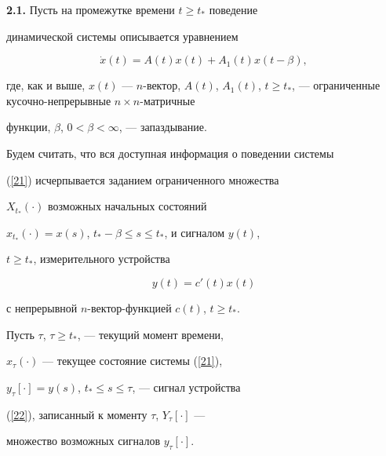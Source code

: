\medskip





{\bf 2.1.} Пусть на промежутке времени $t \ge t_{*}$ поведение


динамической системы описывается уравнением


\begin{equation}\label{21}


\Dot x (t)=A(t)x(t)+A_1(t)x(t-\beta),


\end{equation}


где, как и выше, $x(t)$ --- $n$-вектор, $A(t)$, $A_1(t)$, $t \ge


t_*$, --- ограниченные кусочно-непрерывные $n \times n$-матричные


функции, $\beta$, $0 < \beta < \infty$, --- запаздывание.





Будем считать, что вся доступная информация о поведении системы


(\ref{21}) исчерпывается заданием ограниченного множества


$X_{t_*}(\cdot)$ возможных начальных состояний


$x_{t_*}(\cdot)=x(s)$, $t_*-\beta \le s \le t_*$, и сигналом $y(t)$,


$t \ge t_*$, измерительного устройства


\begin{equation}\label{22}


y(t)=c'(t)x(t)


\end{equation}


с непрерывной $n$-вектор-функцией $c(t)$, $t \ge t_*$.





Пусть $\tau$, $\tau \ge t_*$, --- текущий момент времени, 


$x_{\tau}(\cdot)$ --- текущее состояние системы (\ref{21}),


$y_{\tau}[\cdot]=y(s)$, $t_* \le s \le \tau$, --- сигнал устройства


(\ref{22}), записанный к моменту $\tau$, $Y_{\tau}[\cdot]$ ---


множество возможных сигналов $y_{\tau}[\cdot]$.





